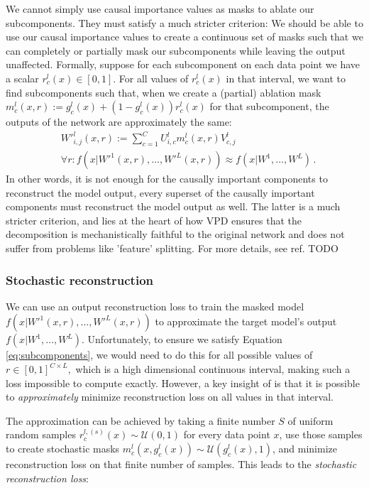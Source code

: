 \documentclass{article}
\begin{document}
We cannot simply use causal importance values as masks to ablate our subcomponents. They must satisfy a much stricter criterion: We should be able to use our causal importance values to create a continuous set of masks such that we can completely or partially mask our subcomponents while leaving the output unaffected. Formally, suppose for each subcomponent on each data point we have a scalar $r^l_c(x) \in [0, 1]$. For all values of $r^l_c(x)$ in that interval, we want to find subcomponents such that, when we create a (partial) ablation mask $m^l_c(x,r) :=g^l_c(x)+(1-g^l_c(x))r^l_c(x)$ for that subcomponent, the outputs of the network are approximately the same:
\begin{equation}\label{eq:subcomponents}
\begin{aligned}
&W'^l_{i,j}(x,r):=\sum^C_{c=1} U^l_{i,c} m^l_c(x,r) V^l_{c,j}  \\
&\forall r: f(x\vert W'^1(x,r),\dots,W'^L(x, r))\approx f(x\vert W^1,\dots,W^L)\,.
\end{aligned}
\end{equation}
In other words, it is not enough for the causally important components to reconstruct the model output, every superset of the causally important components must reconstruct the model output as well. The latter is a much stricter criterion, and lies at the heart of how VPD ensures that the decomposition is mechanistically faithful to the original network and does not suffer from problems like 'feature' splitting. For more details, see ref. TODO


\subsubsection{Stochastic reconstruction}
We can use an output reconstruction loss to train the masked model $f(x\vert W'^1(x,r),\dots,W'^L(x, r))$ to approximate the target model's output $f(x\vert W^1,\dots,W^L)$. Unfortunately, to ensure we satisfy Equation \ref{eq:subcomponents}, we would need to do this for all possible values of $r\in {[0,1]}^{C\times L},$ which is a high dimensional continuous interval, making such a loss impossible to compute exactly. However, a key insight of \cite{bushnaq2025spd} is that it is possible to \textit{approximately} minimize reconstruction loss on all values in that interval. 

The approximation can be achieved by taking a finite number $S$ of uniform random samples $r^{l,(s)}_{c}(x) \sim \mathcal{U}(0,1)$ for every data point $x$, use those samples to create stochastic masks $m^l_c(x, g^l_c(x)) \sim \mathcal{U}(g^l_c(x), 1)$, and minimize reconstruction loss on that finite number of samples. This leads to the \textit{stochastic reconstruction loss}:
\end{document}
